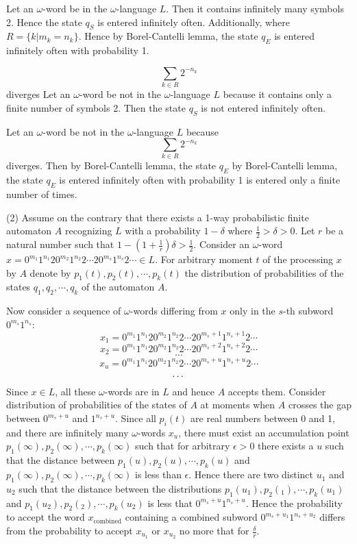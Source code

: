 \documentclass{llncs}
\begin{document}
Let an $\omega $-word be in the $\omega $-language $L$. Then it contains infinitely many symbols 2. Hence the state $q_S$ is entered infinitely often. 
Additionally,
 where $R = \{ k | m_k = n_k \}$. Hence by Borel-Cantelli lemma, the state $q_E$ is entered infinitely often with probability 1.

$$
\sum_{k \in R}{2^{-n_k}}
$$
diverges
Let an $\omega $-word be not in the $\omega $-language $L$ because it contains only a finite number of symbols 2. Then the state $q_S$ is not entered infinitely often.

Let an $\omega $-word be not in the $\omega $-language $L$ because
$$
\sum_{k \in R}{2^{-n_k}}
$$
diverges. Then by Borel-Cantelli lemma, the state $q_E$ by Borel-Cantelli lemma, the state $q_E$ is entered infinitely often with probability 1 is entered only a finite number of times. 

\bigskip


(2) Assume on the contrary that there exists a 1-way probabilistic finite
automaton $A$ recognizing $L$ with a probability $1 - \delta $ where $\frac{1}{2} > \delta > 0$. Let $r$ be a natural number such that 
$1-(1+\frac{1}{r}) \delta >\frac{1}{2}$.
Consider an $\omega $-word
$x = 0^{m_1}1^{n_1}20^{m_2}1^{n_2}2\cdots 20^{m_s}1^{n_s}2\cdots \in L$. 
For arbitrary moment $t$ of the processing $x$ by $A$ denote by $p_1(t), p_2(t), \cdots , p_k(t)$ the distribution of probabilities
of the states $q_1, q_2, \cdots , q_k$ of the automaton $A$. 

Now consider a sequence of $\omega$-words differing from $x$ only in the $s$-th subword $0^{m_s}1^{n_s}$:
$$
x_1 = 0^{m_1}1^{n_1}20^{m_2}1^{n_2}2\cdots 20^{m_s+1}1^{n_s+1}2\cdots 
$$
$$
x_2 = 0^{m_1}1^{n_1}20^{m_2}1^{n_2}2\cdots 20^{m_s+2}1^{n_s+2}2\cdots 
$$
$$
\cdots 
$$
$$
x_u = 0^{m_1}1^{n_1}20^{m_2}1^{n_2}2\cdots 20^{m_s+u}1^{n_s+u}2\cdots 
$$
$$
\cdots \\
$$
Since $x \in L$, all these $\omega $-words are in $L$ and hence $A$ accepts them. Consider distribution of probabilities of the states
of $A$ at moments when $A$ crosses the gap between $0^{m_s+u}$ and $1^{n_s+u}$. Since all $p_i(t)$ are real numbers between 0 and 1, and there are infinitely many $\omega $-words $x_u$, there must exist an accumulation point $p_1(\infty ), p_2(\infty ), \cdots , p_k(\infty )$ such that for arbitrary
$\epsilon > 0$ there exists a $u$ such that the distance between $p_1(u), p_2(u), \cdots , p_k(u)$ and $p_1(\infty ), p_2(\infty ), \cdots , p_k(\infty )$ is less than $\epsilon $. Hence there are two distinct  $u_1$ and $u_2$ such that the distance between the distributions $p_1(u_1), p_2(_1), \cdots , p_k(u_1)$
and $p_1(u_2), p_2(_2), \cdots , p_k(u_2)$ is less that $0^{m_s+u}1^{n_s+u}$. Hence the probability to accept the word $x_{\mbox{combined}}$ containing a combined subword $0^{m_s+u_1}1^{n_s+u_2}$ differs from the probability to accept $x_{u_1}$ or $x_{u_2}$ no more that for $\frac{\delta }{r}$.
\end{document}
